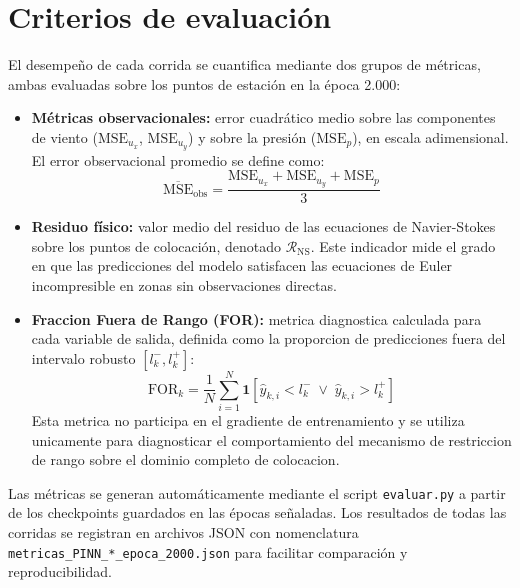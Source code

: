\section{Criterios de evaluación}

El desempeño de cada corrida se cuantifica mediante dos grupos de métricas, ambas evaluadas sobre los puntos de estación en la época 2.000:

\begin{itemize}
	\item \textbf{Métricas observacionales:} error cuadrático medio sobre las componentes de viento ($\text{MSE}_{u_x}$, $\text{MSE}_{u_y}$) y sobre la presión ($\text{MSE}_p$), en escala adimensional. El error observacional promedio se define como:
	\[
	\overline{\text{MSE}}_{\text{obs}} = \frac{\text{MSE}_{u_x} + \text{MSE}_{u_y} + \text{MSE}_p}{3}
	\]
	
	\item \textbf{Residuo físico:} valor medio del residuo de las ecuaciones de Navier-Stokes sobre los puntos de colocación, denotado $\mathcal{R}_{\text{NS}}$. Este indicador mide el grado en que las predicciones del modelo satisfacen las ecuaciones de Euler incompresible en zonas sin observaciones directas.

	\item \textbf{Fraccion Fuera de Rango (FOR):} metrica diagnostica calculada para cada variable de salida, definida como la proporcion de predicciones fuera del intervalo robusto $[l_k^-, l_k^+]$:
	\[
	\text{FOR}_k = \frac{1}{N}\sum_{i=1}^{N} \mathbf{1}\!\left[\hat{y}_{k,i} < l_k^- \;\vee\; \hat{y}_{k,i} > l_k^+\right]
	\]
	Esta metrica no participa en el gradiente de entrenamiento y se utiliza unicamente para diagnosticar el comportamiento del mecanismo de restriccion de rango sobre el dominio completo de colocacion.
\end{itemize}

Las métricas se generan automáticamente mediante el script \texttt{evaluar.py} a partir de los checkpoints guardados en las épocas señaladas. Los resultados de todas las corridas se registran en archivos JSON con nomenclatura \texttt{metricas\_PINN\_*\_epoca\_2000.json} para facilitar comparación y reproducibilidad.





